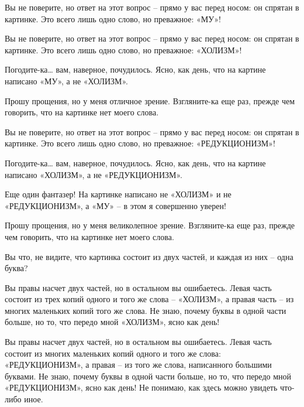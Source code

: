 \documentclass[../main.tex]{subfiles}
\begin{document}


\begin{dialogue}

 Вы не поверите, но ответ на этот вопрос \--- прямо у вас перед носом: он спрятан в картинке. Это всего лишь одно слово, но преважное: «МУ»!

 Вы не поверите, но ответ на этот вопрос \--- прямо у вас перед носом: он спрятан в картинке. Это всего лишь одно слово, но преважное: «ХОЛИЗМ»!

 Погодите-ка\ldots{} вам, наверное, почудилось. Ясно, как день, что на картине написано «МУ», а не «ХОЛИЗМ».

 Прошу прощения, но у меня отличное зрение. Взгляните-ка еще раз, прежде чем говорить, что на картинке нет моего слова.

 Вы не поверите, но ответ на этот вопрос \--- прямо у вас перед носом: он спрятан в картинке. Это всего лишь одно слово, но преважное: «РЕДУКЦИОНИЗМ»!

 Погодите-ка\ldots{} вам, наверное, почудилось. Ясно, как день, что на картине написано «ХОЛИЗМ», а не «РЕДУКЦИОНИЗМ».

 Еще один фантазер! На картинке написано не «ХОЛИЗМ» и не «РЕДУКЦИОНИЗМ», а «МУ» \--- в этом я совершенно уверен!

 Прошу прощения, но у меня великолепное зрение. Взгляните-ка еще раз, прежде чем говорить, что на картинке нет моего слова.

 Вы что, не видите, что картинка состоит из двух частей, и каждая из них \--- одна буква?

 Вы правы насчет двух частей, но в остальном вы ошибаетесь. Левая часть состоит из трех копий одного и того же слова \--- «ХОЛИЗМ», а правая часть \--- из многих маленьких копий того же слова. Не знаю, почему буквы в одной части больше, но то, что передо мной «ХОЛИЗМ», ясно как день!

 Вы правы насчет двух частей, но в остальном вы ошибаетесь. Левая часть состоит из многих маленьких копий одного и того же слова: «РЕДУКЦИОНИЗМ», а правая \--- из того же слова, написанного большими буквами. Не знаю, почему буквы в одной части больше, но то, что передо мной «РЕДУКЦИОНИЗМ», ясно как день! Не понимаю, как здесь можно увидеть что-либо иное.


\end{dialogue}
\end{document}

